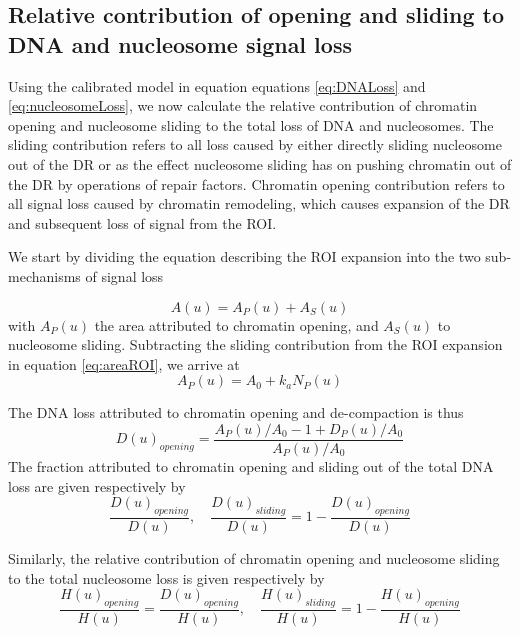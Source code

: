 \documentclass[12pt]{article}
\begin{document}
\subsection{Relative contribution of opening and sliding to DNA
	and nucleosome signal loss}

Using the calibrated model in equation equations \eqref{eq:DNALoss}  and \eqref{eq:nucleosomeLoss}, we now calculate the
relative contribution of chromatin opening and nucleosome sliding to the
total loss of DNA and nucleosomes. The sliding contribution refers to all loss
caused by either directly sliding nucleosome out of the DR or as the effect
nucleosome sliding has on pushing chromatin out of the DR by operations
of repair factors. Chromatin opening contribution refers to all signal loss
caused by chromatin remodeling, which causes expansion of the DR and
subsequent loss of signal from the ROI.

We start by dividing the equation describing the ROI expansion into the
two sub-mechanisms of signal loss

\begin{equation*}
A(u) = A_P(u) +A_S(u)
\end{equation*}
with $A_P(u)$ the area attributed to chromatin opening, and $A_S(u)$ to nucleosome sliding. Subtracting the sliding contribution from the ROI expansion
in equation \eqref{eq:areaROI}, we arrive at
\begin{equation*}
A_P(u) = A_0 + k_aN_P(u)
\end{equation*}

The DNA loss attributed to chromatin opening and de-compaction is thus
\begin{equation*}
D(u)_{opening}= \frac{A_P(u)/A_0 -1 +D_P(u)/A_0}{A_P(u)/A_0}
\end{equation*}	
The fraction attributed to chromatin opening and sliding out of the total
DNA loss are given respectively by
\begin{equation}\label{eq:relativeOpeningSlidingDNA}
\frac{D(u)_{opening}}{D(u)}, \quad \frac{D(u)_{sliding}}{D(u)}=1-\frac{D(u)_{opening}}{D(u)}
\end{equation}

Similarly, the relative contribution of chromatin opening and nucleosome
sliding to the total nucleosome loss is given respectively by
\begin{equation}\label{eq:relativeOpeningSlidingNucleosomes}
\frac{H(u)_{opening}}{H(u)} = \frac{D(u)_{opening}}{H(u)},\quad \frac{H(u)_{sliding}}{H(u)}=1-\frac{H(u)_{opening}}{H(u)}
\end{equation}
\end{document}
